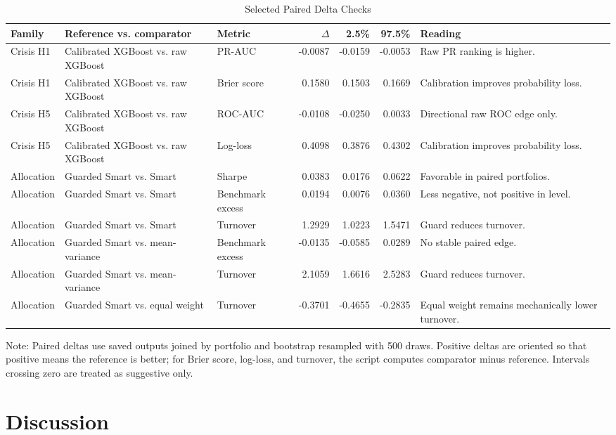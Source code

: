 \documentclass{ieeeaccess}
\newcommand{\tabnote}[1]{\vspace{2pt}\begin{flushleft}\footnotesize Note: #1\end{flushleft}}
\begin{document}
\begin{table}[t]
\caption{Selected Paired Delta Checks}
\label{tab:paired-delta}
\centering
\scriptsize
\begin{tabularx}{\textwidth}{l Y Y r r r Y}
\toprule
Family & Reference vs. comparator & Metric & $\Delta$ & 2.5\% & 97.5\% & Reading \\
\midrule
Crisis H1 & Calibrated XGBoost vs. raw XGBoost & PR-AUC & -0.0087 & -0.0159 & -0.0053 & Raw PR ranking is higher. \\
Crisis H1 & Calibrated XGBoost vs. raw XGBoost & Brier score & 0.1580 & 0.1503 & 0.1669 & Calibration improves probability loss. \\
Crisis H5 & Calibrated XGBoost vs. raw XGBoost & ROC-AUC & -0.0108 & -0.0250 & 0.0033 & Directional raw ROC edge only. \\
Crisis H5 & Calibrated XGBoost vs. raw XGBoost & Log-loss & 0.4098 & 0.3876 & 0.4302 & Calibration improves probability loss. \\
Allocation & Guarded Smart vs. Smart & Sharpe & 0.0383 & 0.0176 & 0.0622 & Favorable in paired portfolios. \\
Allocation & Guarded Smart vs. Smart & Benchmark excess & 0.0194 & 0.0076 & 0.0360 & Less negative, not positive in level. \\
Allocation & Guarded Smart vs. Smart & Turnover & 1.2929 & 1.0223 & 1.5471 & Guard reduces turnover. \\
Allocation & Guarded Smart vs. mean-variance & Benchmark excess & -0.0135 & -0.0585 & 0.0289 & No stable paired edge. \\
Allocation & Guarded Smart vs. mean-variance & Turnover & 2.1059 & 1.6616 & 2.5283 & Guard reduces turnover. \\
Allocation & Guarded Smart vs. equal weight & Turnover & -0.3701 & -0.4655 & -0.2835 & Equal weight remains mechanically lower turnover. \\
\bottomrule
\end{tabularx}
\tabnote{Paired deltas use saved outputs joined by portfolio and bootstrap resampled with 500 draws. Positive deltas are oriented so that positive means the reference is better; for Brier score, log-loss, and turnover, the script computes comparator minus reference. Intervals crossing zero are treated as suggestive only.}
\end{table}

\section{Discussion}
\label{sec:discussion}
\end{document}
